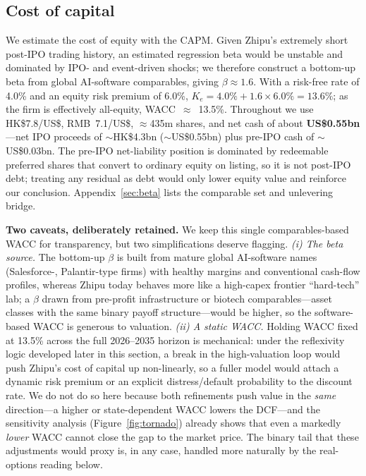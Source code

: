 \documentclass[11pt]{article}
\begin{document}
\subsection{Cost of capital}
We estimate the cost of equity with the CAPM. Given Zhipu's extremely short post-IPO trading history, an
estimated regression beta would be unstable and dominated by IPO- and event-driven shocks; we therefore
construct a bottom-up beta from global AI-software comparables, giving $\beta \approx 1.6$. With a risk-free
rate of 4.0\% and an equity risk premium of 6.0\%, $K_e = 4.0\% + 1.6\times 6.0\% = 13.6\%$; as the firm is
effectively all-equity, WACC~$\approx$~13.5\%. Throughout we use HK\$7.8/US\$, RMB~7.1/US\$, $\approx$435m
shares, and net cash of about \textbf{US\$0.55bn}---net IPO proceeds of $\sim$HK\$4.3bn ($\sim$US\$0.55bn)
plus pre-IPO cash of $\sim$US\$0.03bn. The pre-IPO net-liability position is dominated by redeemable preferred
shares that convert to ordinary equity on listing, so it is not post-IPO debt; treating any residual as debt
would only lower equity value and reinforce our conclusion. Appendix~\ref{sec:beta} lists the comparable set
and unlevering bridge.

\textbf{Two caveats, deliberately retained.} We keep this single comparables-based WACC for transparency, but
two simplifications deserve flagging. \emph{(i) The beta source.} The bottom-up $\beta$ is built from mature
global AI-software names (Salesforce-, Palantir-type firms) with healthy margins and conventional cash-flow
profiles, whereas Zhipu today behaves more like a high-capex frontier ``hard-tech'' lab; a $\beta$ drawn from
pre-profit infrastructure or biotech comparables---asset classes with the same binary payoff
structure---would be higher, so the software-based WACC is generous to valuation. \emph{(ii) A static WACC.} Holding WACC fixed at 13.5\%
across the full 2026--2035 horizon is mechanical: under the reflexivity logic developed later in this section,
a break in the high-valuation loop would push Zhipu's cost of capital up non-linearly, so a fuller model would
attach a dynamic risk premium or an explicit distress/default probability to the discount rate. We do not do so
here because both refinements push value in the \emph{same} direction---a higher or state-dependent WACC lowers
the DCF---and the sensitivity analysis (Figure~\ref{fig:tornado}) already shows that even a markedly \emph{lower}
WACC cannot close the gap to the market price. The binary tail that these adjustments would proxy is, in any
case, handled more naturally by the real-options reading below.
\end{document}

